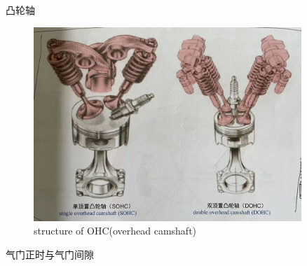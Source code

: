 \begin{frame}
	\begin{block}{凸轮轴}
		\begin{figure}[htbp]
			\centering
			\caption{structure of OHC(overhead camshaft)}
			\includegraphics[width=0.9\textwidth]{2-18}
		\end{figure}
	\end{block}
\end{frame}
\begin{frame}
	\begin{block}{气门正时与气门间隙}
		\begin{figure}[htbp]
			\centering
		\end{figure}
	\end{block}
\end{frame}
